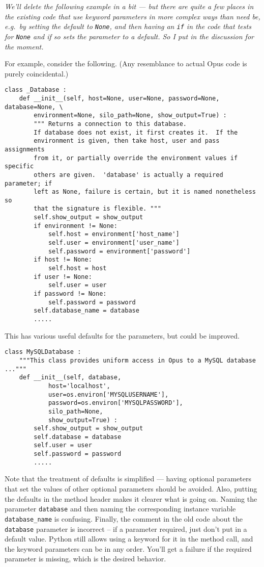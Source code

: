 \emph{We'll delete the following example in a bit --- but there are
quite a few places in the existing code that use keyword parameters in more
complex ways than need be, e.g.\ by setting the default to {\tt None}, and
then having an {\tt if} in the code that tests for {\tt None} and if so sets
the parameter to a default.  So I put in the discussion for the moment.}

For example, consider the following.  (Any resemblance to actual Opus
code is purely coincidental.)
\begin{verbatim}
class _Database :
    def __init__(self, host=None, user=None, password=None, database=None, \
        environment=None, silo_path=None, show_output=True) :
        """ Returns a connection to this database.
        If database does not exist, it first creates it.  If the
        environment is given, then take host, user and pass assignments
        from it, or partially override the environment values if specific
        others are given.  'database' is actually a required parameter; if
        left as None, failure is certain, but it is named nonetheless so
        that the signature is flexible. """
        self.show_output = show_output
        if environment != None:
            self.host = environment['host_name']
            self.user = environment['user_name']
            self.password = environment['password']
        if host != None:
            self.host = host
        if user != None:
            self.user = user
        if password != None:
            self.password = password
        self.database_name = database
        .....
\end{verbatim}

This has various useful defaults for the parameters, but could be improved.

\begin{verbatim}
class MySQLDatabase :
    """This class provides uniform access in Opus to a MySQL database ..."""
    def __init__(self, database,
            host='localhost',
            user=os.environ['MYSQLUSERNAME'],
            password=os.environ['MYSQLPASSWORD'],
            silo_path=None,
            show_output=True) :
        self.show_output = show_output
        self.database = database
        self.user = user
        self.password = password
        .....
\end{verbatim}

Note that the treatment of defaults is simplified --- having optional
parameters that set the values of other optional parameters should be
avoided.  Also, putting the defaults in the method header makes it clearer
what is going on.  Naming the parameter \verb|database| and then naming
the corresponding instance variable \verb|database_name| is confusing.
Finally, the comment in the old code about the \verb|database| parameter
is incorrect -- if a parameter required, just don't put in a default value.
Python still allows using a keyword for it in the method call, and the
keyword parameters can be in any order.  You'll get a failure if the required
parameter is missing, which is the desired behavior.

